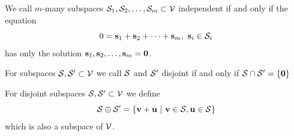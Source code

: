     \begin{definition}
        We call \(m\)-many subspaces \(\mathcal{S}_1, \mathcal{S}_2, \dots, \mathcal{S}_m \subset \mathcal{V}\) independent if and only if the equation 
        \[0 = \mathbf{s}_1 + \mathbf{s}_2 + \cdots + \mathbf{s} _m , \ \mathbf{s}_i \in \mathcal{S}_i \] 
        has only the solution \( \mathbf{s}_1, \mathbf{s}_2, \dots, \mathbf{s} _m = \mathbf{0} \).
    \end{definition}
    \vspace{1pt}
    \begin{definition}
    For subspaces $\mathcal{S}, \mathcal{S}' \subset \mathcal{V}$ we call $\mathcal{S}$ and $\mathcal{S}'$ disjoint if and only if $\mathcal{S} \cap \mathcal{S}' = \{\mathbf{0}\}$
    \end{definition}
    \vspace{1pt}
    \begin{definition}
    For disjoint subspaces $\mathcal{S}, \mathcal{S}' \subset \mathcal{V}$ we define
    \[
        \vecspace{S} \oplus \vecspace{S}' = \{\vec{v}+\vec{u} \ | \ \vec{v}\in\vecspace{S},\vec{u}\in\vecspace{S}\}
    \]
    which is also a subspace of $\mathcal{V}$.
    \end{definition}



    